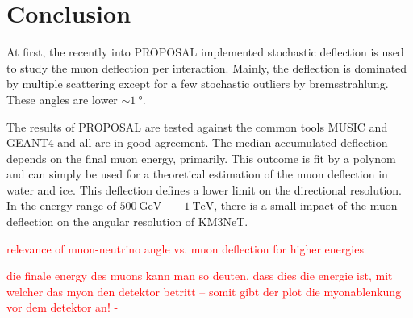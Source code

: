 \section{Conclusion}\label{sec:conclusion}

At first, the recently into PROPOSAL implemented stochastic deflection is 
used to study the muon deflection per interaction. Mainly, the deflection 
is dominated by multiple scattering except for a few stochastic 
outliers by bremsstrahlung. These angles are lower $\sim\SI{1}{\degree}$. 

The results of PROPOSAL are tested against the common tools MUSIC and 
GEANT4 and all are in good agreement.
The median accumulated deflection depends on the final muon energy, primarily. 
This outcome is fit by a polynom and can simply be used for 
a theoretical estimation of the muon deflection in water and ice.
This deflection defines a lower limit on the directional resolution.
In the energy range of $\SI{500}{\giga\electronvolt} -- \SI{1}{\tera\electronvolt}$, there is a small impact of the muon deflection on the angular 
resolution of KM3NeT.

\textcolor{red}{relevance of muon-neutrino angle vs. muon deflection for higher energies}

\textcolor{red}{die finale energy des muons kann man so deuten, dass dies die energie ist, mit welcher das myon den detektor betritt -- somit gibt der plot die myonablenkung vor dem detektor an! -}
